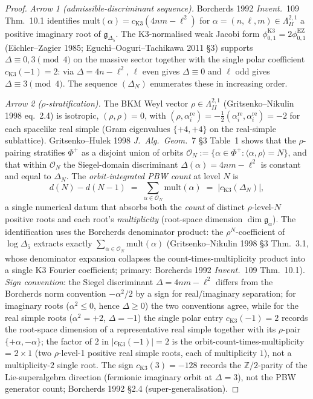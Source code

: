 \begin{proof}
\emph{Arrow 1 (admissible-discriminant sequence).} Borcherds 1992
\emph{Invent.}~109 Thm.~10.1 identifies
$\mathrm{mult}(\alpha) = c_{\mathrm{K3}}(4nm - \ell^2)$ for
$\alpha = (n,\ell,m)\in\Lambda^{2,1}_{II}$ a positive imaginary root
of $\mathfrak g_{\Delta_5}$. The K3-normalised weak Jacobi form
$\phi_{0,1}^{\mathrm{K3}} = 2\phi_{0,1}^{\mathrm{EZ}}$
(Eichler--Zagier 1985; Eguchi--Ooguri--Tachikawa 2011 \S3) supports
$\Delta\equiv 0,3\pmod 4$ on the massive sector together with the
single polar coefficient $c_{\mathrm{K3}}(-1) = 2$: via
$\Delta = 4n - \ell^2$, $\ell$ even gives $\Delta\equiv 0$ and $\ell$
odd gives $\Delta\equiv 3\pmod 4$. The sequence $(\Delta_N)$
enumerates these in increasing order.

\emph{Arrow 2 ($\rho$-stratification).} The BKM Weyl vector
$\rho\in\Lambda^{2,1}_{II}$ (Gritsenko--Nikulin 1998 eq.~2.4) is
isotropic, $(\rho,\rho) = 0$, with
$(\rho,\alpha^{\mathrm{re}}_i) = -\tfrac{1}{2}(\alpha^{\mathrm{re}}_i,
\alpha^{\mathrm{re}}_i) = -2$ for each spacelike real simple
(Gram eigenvalues $\{+4,+4\}$ on the real-simple sublattice). Gritsenko--Hulek 1998 \emph{J.~Alg.~Geom.}~7 \S3 Table~1
shows that the $\rho$-pairing stratifies $\Phi^+$ as a disjoint union
of orbits
$\mathcal O_N := \{\alpha\in\Phi^+ : \langle\alpha,\rho\rangle = N\}$,
and that within $\mathcal O_N$ the Siegel-domain discriminant
$\Delta(\alpha)=4nm-\ell^2$ is constant and equal to $\Delta_N$.
The \emph{orbit-integrated PBW count} at level $N$ is
\[
 d(N) - d(N-1)
 \;=\;
 \sum_{\alpha\in\mathcal O_N}\mathrm{mult}(\alpha)
 \;=\;
 |c_{\mathrm{K3}}(\Delta_N)|,
\]
a single numerical datum that absorbs both the \emph{count} of distinct
$\rho$-level-$N$ positive roots and each root's \emph{multiplicity}
(root-space dimension $\dim\mathfrak g_\alpha$). The identification
uses the Borcherds denominator product: the $\rho^N$-coefficient of
$\log\Delta_5$ extracts exactly
$\sum_{\alpha\in\mathcal O_N}\mathrm{mult}(\alpha)$ (Gritsenko--Nikulin
1998 \S3 Thm.~3.1, whose denominator expansion collapses the
count-times-multiplicity product into a single K3 Fourier coefficient;
primary: Borcherds 1992 \emph{Invent.}~109 Thm.~10.1).
\emph{Sign convention}: the Siegel discriminant $\Delta = 4nm-\ell^2$
differs from the Borcherds norm convention $-\alpha^2/2$ by a sign for
real/imaginary separation; for imaginary roots
($\alpha^2\le 0$, hence $\Delta\ge 0$) the two conventions agree, while
for the real simple roots ($\alpha^2 = +2$, $\Delta=-1$) the single
polar entry $c_{\mathrm{K3}}(-1)=2$ records the root-space dimension of
a representative real simple together with its $\rho$-pair $\{+\alpha,
-\alpha\}$; the factor of $2$ in $|c_{\mathrm{K3}}(-1)|=2$ is the
orbit-count-times-multiplicity = $2\times 1$ (two $\rho$-level-1
positive real simple roots, each of multiplicity $1$), not a
multiplicity-$2$ single root. The sign $c_{\mathrm{K3}}(3) = -128$
records the $\mathbb Z/2$-parity of the Lie-superalgebra direction
(fermionic imaginary orbit at $\Delta=3$), not the PBW generator count;
Borcherds 1992 \S2.4 (super-generalisation).


\end{proof}
